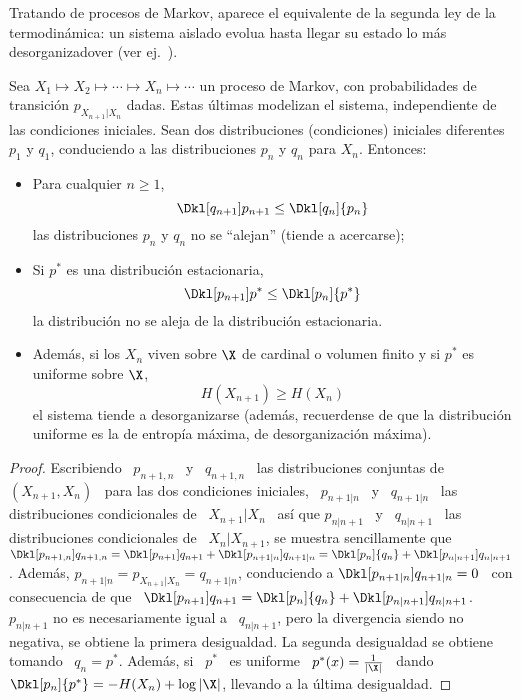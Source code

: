 

Tratando de procesos  de Markov, aparece el equivalente de la  segunda ley de la
termodin\'amica:  un sistema  aislado evolua  hasta  llegar su  estado lo  m\'as
desorganizadover (ver ej.~\cite{CovTho06}).

\begin{lema}%
  Sea $X_1 \mapsto X_2 \mapsto \cdots  \mapsto X_n \mapsto \cdots$ un proceso de
  Markov,  con probabilidades  de transici\'on  $p_{X_{n+1}|X_n}$  dadas.  Estas
  \'ultimas modelizan  el sistema,  independiente de las  condiciones iniciales.
  Sean  dos distribuciones  (condiciones)  iniciales diferentes  $p_1$ y  $q_1$,
  conduciendo a las distribuciones $p_n$ y $q_n$ para $X_n$. Entonces:
%
\begin{itemize}
\item  Para cualquier  $n \ge  1$,
  \[
  \Dkl[q_{n+1}]{p_{n+1}} \le \Dkl[q_n]{p_n}
  \]
  las distribuciones $p_n$ y $q_n$ no se ``alejan'' (tiende a acercarse);
%
\item  Si  $p^*$  es  una  distribuci\'on  estacionaria,
  \[
  \Dkl[p_{n+1}]{p^*} \le \Dkl[p_n]{p^*}
  \]
  la distribuci\'on no se aleja de la distribuci\'on estacionaria.
%
\item Adem\'as, si los $X_n$ viven sobre  $\X$ de cardinal o volumen finito y si
  $p^*$ es uniforme sobre $\X$,
  \[
  H(X_{n+1}) \ge H(X_n)
  \]
  el  sistema   tiende  a  desorganizarse  (adem\'as,  recuerdense   de  que  la
  distribuci\'on uniforme es la de entrop\'ia m\'axima, \ie de desorganizaci\'on
  m\'axima).
\end{itemize}
\end{lema}
%
\begin{proof}
  Escribiendo \ $p_{n+1,n}$ \ y  \ $q_{n+1,n}$ \ las distribuciones conjuntas de
  $(X_{n+1},X_n)$  \ para las  dos condiciones  iniciales, \  $p_{n+1|n}$ \  y \
  $q_{n+1|n}$ \ las distribuciones condicionales  de \ $X_{n+1}|X_n$ \ as\'i que
  $p_{n|n+1}$  \  y  \  $q_{n|n+1}$  \ las  distribuciones  condicionales  de  \
  $X_n|X_{n+1}$,  se muestra sencillamente  que \  $\Dkl[p_{n+1,n}]{q_{n+1,n}} =
  \Dkl[p_{n+1}]{q_{n+1}}   +  \Dkl[p_{n+1|n}]{q_{n+1|n}}   =   \Dkl[p_n]{q_n}  +
  \Dkl[p_{n|n+1}]{q_{n|n+1}}$.    Adem\'as,  $p_{n+1|n}   =   p_{X_{n+1}|X_n}  =
  q_{n+1|n}$, conduciendo a $\Dkl[p_{n+1|n}]{q_{n+1|n}}  = 0$ \ con consecuencia
  de      que     \      $\Dkl[p_{n+1}]{q_{n+1}}     =      \Dkl[p_n]{q_n}     +
  \Dkl[p_{n|n+1}]{q_{n|n+1}}$.   \ $p_{n|n+1}$  no es  necesariamente igual  a \
  $q_{n|n+1}$, pero  la divergencia  siendo no negativa,  se obtiene  la primera
  desigualdad.   La  segunda desigualdad  se  obtiene  tomando  \ $q_n  =  p^*$.
  Adem\'as,  si \ $p^*$  \ es  uniforme \  $p^*(x) =  \frac{1}{|\X|}$ \  dando \
  $\Dkl[p_n]{p^*} = -H(X_n) + \log |\X|$, llevando a la \'ultima desigualdad.
\end{proof}


